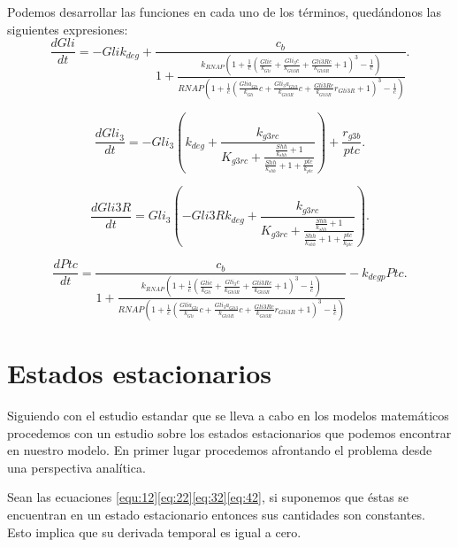 Podemos desarrollar las funciones en cada uno de los términos, quedándonos las siguientes expresiones:
\begin{equation}
\frac{dGli}{dt}=- Gli k_{deg} + \frac{c_{b}}{1 + \frac{k_{RNAP} \left(1 + \frac{1}{c} \left(\frac{Gli c}{k_{Gli}} + \frac{Gli_{3} c}{k_{Gli3R}} + \frac{Gli3R c}{k_{Gli3R}} + 1\right)^{3} - \frac{1}{c}\right)}{RNAP \left(1 + \frac{1}{c} \left(\frac{Gli a_{Gli}}{k_{Gli}} c + \frac{Gli_{3} a_{Gli3}}{k_{Gli3R}} c + \frac{Gli3R c}{k_{Gli3R}} r_{Gli3R} + 1\right)^{3} - \frac{1}{c}\right)}}.
\end{equation}


\begin{equation}
\frac{dGli_3}{dt}=- Gli_{3} \left(k_{deg} + \frac{k_{g3rc}}{K_{g3rc} + \frac{\frac{Shh}{k_{shh}} + 1}{\frac{Shh}{k_{shh}} + 1 + \frac{ptc}{k_{ptc}}}}\right) + \frac{r_{g3b}}{ptc}.
\end{equation}

\begin{equation}
\frac{dGli3R}{dt}=Gli_{3} \left(- Gli3R k_{deg} + \frac{k_{g3rc}}{K_{g3rc} + \frac{\frac{Shh}{k_{shh}} + 1}{\frac{Shh}{k_{shh}} + 1 + \frac{ptc}{k_{ptc}}}}\right).
\end{equation}

\begin{equation}
\frac{dPtc}{dt}=\frac{c_{b}}{1 + \frac{k_{RNAP} \left(1 + \frac{1}{c} \left(\frac{Gli c}{k_{Gli}} + \frac{Gli_{3} c}{k_{Gli3R}} + \frac{Gli3R c}{k_{Gli3R}} + 1\right)^{3} - \frac{1}{c}\right)}{RNAP \left(1 + \frac{1}{c} \left(\frac{Gli a_{Gli}}{k_{Gli}} c + \frac{Gli_{3} a_{Gli3}}{k_{Gli3R}} c + \frac{Gli3R c}{k_{Gli3R}} r_{Gli3R} + 1\right)^{3} - \frac{1}{c}\right)}} - k_{deg p} Ptc.
\end{equation}




\section{Estados estacionarios}\label{apartado3.4}
Siguiendo con el estudio estandar que se lleva a cabo en los modelos matemáticos procedemos con un estudio sobre los estados estacionarios que podemos encontrar en nuestro modelo. En primer lugar procedemos afrontando el problema desde una perspectiva analítica. 

Sean las ecuaciones \ref{equ:12}\ref{eq:22}\ref{eq:32}\ref{eq:42}, si suponemos que éstas se encuentran en un estado estacionario entonces sus cantidades son constantes. Esto implica que su derivada temporal es igual a cero.

